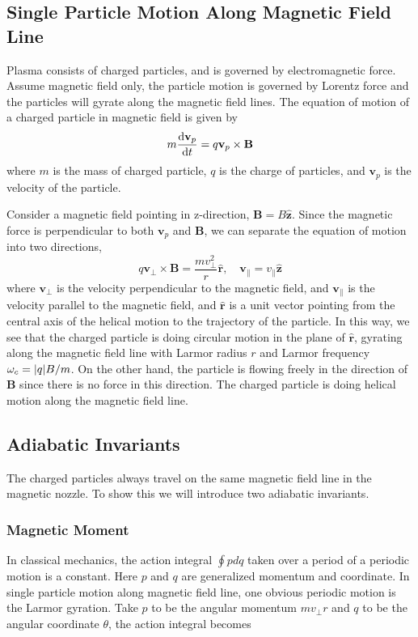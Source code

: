 \subsection{Single Particle Motion Along Magnetic Field Line}
Plasma consists of charged particles, and is governed by electromagnetic force. Assume magnetic field only, the particle motion is governed by Lorentz force and the particles will gyrate along the magnetic field lines. The equation of motion of a charged particle in magnetic field is given by
\[ m\dv{\mathbf{v}_p}{t} = q\mathbf{v}_p\times \mathbf{B} \]
where $m$ is the mass of charged particle, $q$ is the charge of particles, and $\mathbf{v}_p$ is the velocity of the particle.

Consider a magnetic field pointing in z-direction, $\mathbf{B}=B\mathbf{\hat{z}}$. Since the magnetic force is perpendicular to both $\mathbf{v}_p$ and $\mathbf{B}$, we can separate the equation of motion into two directions,
\[
	q\mathbf{v_{\perp}\times B} = \frac{mv_{\perp}^2}{r}\mathbf{\hat{r}},
	\quad
	\mathbf{v}_{\parallel} = v_{\parallel} \mathbf{\hat{z}} \]
where $\mathbf{v}_{\perp}$ is the velocity perpendicular to the magnetic field, and $\mathbf{v}_{\parallel}$ is the velocity parallel to the magnetic field, and $\mathbf{\hat{r}}$ is a unit vector pointing from the central axis of the helical motion to the trajectory of the particle. In this way, we see that the charged particle is doing circular motion in the plane of $\mathbf{\hat{r}}$, gyrating along the magnetic field line with Larmor radius $r$ and Larmor frequency $\omega_c = \abs{q}B/m$. On the other hand, the particle is flowing freely in the direction of $\mathbf{B}$ since there is no force in this direction. The charged particle is doing helical motion along the magnetic field line.

\subsection{Adiabatic Invariants}
The charged particles always travel on the same magnetic field line in the magnetic nozzle. To show this we will introduce two adiabatic invariants.

\subsubsection*{Magnetic Moment}
In classical mechanics, the action integral $\oint pdq$ taken over a period of a periodic motion is a constant. Here $p$ and $q$ are generalized momentum and coordinate. In single particle motion along magnetic field line, one obvious periodic motion is the Larmor gyration. Take $p$ to be the angular momentum $mv_\perp r$ and $q$ to be the angular coordinate $\theta$, the action integral becomes

